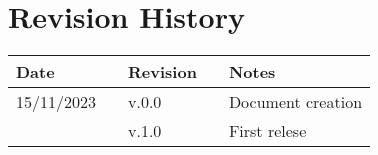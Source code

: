 \chapter*{Revision History}

\begin{table}[h]
    \centering
    \begin{tabular}{l p{2.5cm} l p{2.5cm} l}
        \hline
        \textbf{Date} & & \textbf{Revision} & & \textbf{Notes}          \\ \hline
        15/11/2023    & & v.0.0             & & Document creation       \\
                      & & v.1.0             & & First relese            \\ \hline                         
    \end{tabular}
\end{table}

\newpage